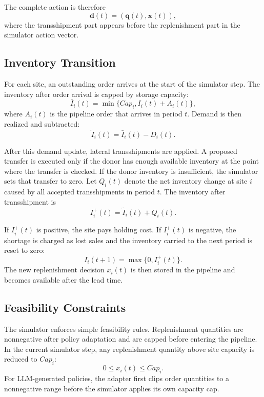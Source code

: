 \documentclass[journal]{IEEEtran}
\begin{document}
The complete action is therefore
\begin{equation}
    \mathbf{d}(t)=\left(\mathbf{q}(t),\mathbf{x}(t)\right),
\end{equation}
where the transshipment part appears before the replenishment part in the simulator action vector.

\subsection{Inventory Transition}

For each site, an outstanding order arrives at the start of the simulator step. The inventory after order arrival is capped by storage capacity:
\begin{equation}
    \bar{I}_i(t)=\min\{Cap_i, I_i(t)+A_i(t)\},
\end{equation}
where $A_i(t)$ is the pipeline order that arrives in period $t$. Demand is then realized and subtracted:
\begin{equation}
    \tilde{I}_i(t)=\bar{I}_i(t)-D_i(t).
\end{equation}

After this demand update, lateral transshipments are applied. A proposed transfer is executed only if the donor has enough available inventory at the point where the transfer is checked. If the donor inventory is insufficient, the simulator sets that transfer to zero. Let $Q_i(t)$ denote the net inventory change at site $i$ caused by all accepted transshipments in period $t$. The inventory after transshipment is
\begin{equation}
    I_i^{+}(t)=\tilde{I}_i(t)+Q_i(t).
\end{equation}

If $I_i^{+}(t)$ is positive, the site pays holding cost. If $I_i^{+}(t)$ is negative, the shortage is charged as lost sales and the inventory carried to the next period is reset to zero:
\begin{equation}
    I_i(t+1)=\max\{0,I_i^{+}(t)\}.
\end{equation}
The new replenishment decision $x_i(t)$ is then stored in the pipeline and becomes available after the lead time.

\subsection{Feasibility Constraints}

The simulator enforces simple feasibility rules. Replenishment quantities are nonnegative after policy adaptation and are capped before entering the pipeline. In the current simulator step, any replenishment quantity above site capacity is reduced to $Cap_i$:
\begin{equation}
    0\leq x_i(t)\leq Cap_i.
\end{equation}
For LLM-generated policies, the adapter first clips order quantities to a nonnegative range before the simulator applies its own capacity cap.
\end{document}
